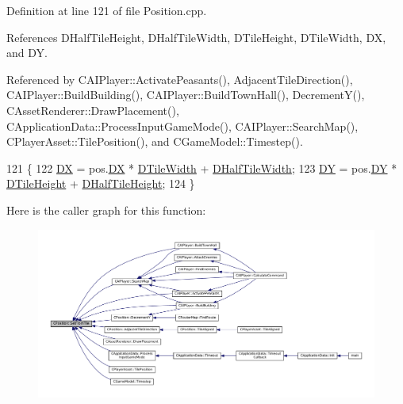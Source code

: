 Definition at line 121 of file Position.\+cpp.



References D\+Half\+Tile\+Height, D\+Half\+Tile\+Width, D\+Tile\+Height, D\+Tile\+Width, DX, and DY.



Referenced by C\+A\+I\+Player\+::\+Activate\+Peasants(), Adjacent\+Tile\+Direction(), C\+A\+I\+Player\+::\+Build\+Building(), C\+A\+I\+Player\+::\+Build\+Town\+Hall(), Decrement\+Y(), C\+Asset\+Renderer\+::\+Draw\+Placement(), C\+Application\+Data\+::\+Process\+Input\+Game\+Mode(), C\+A\+I\+Player\+::\+Search\+Map(), C\+Player\+Asset\+::\+Tile\+Position(), and C\+Game\+Model\+::\+Timestep().


\begin{DoxyCode}
121                                                \{
122     \hyperlink{classCPosition_a28445f9b872169715919074d82044eda}{DX} = pos.\hyperlink{classCPosition_a28445f9b872169715919074d82044eda}{DX} * \hyperlink{classCPosition_ac17d12fb5d35fcf62d63bb42e8cf7ed6}{DTileWidth} + \hyperlink{classCPosition_a3227e835d9008346e9d91bdad2380f14}{DHalfTileWidth};
123     \hyperlink{classCPosition_a84139c9e8eb547e7cf3cb851739943a4}{DY} = pos.\hyperlink{classCPosition_a84139c9e8eb547e7cf3cb851739943a4}{DY} * \hyperlink{classCPosition_a202ebb83e86df75cfb76cf1241ba817c}{DTileHeight} + \hyperlink{classCPosition_a1e0af68f7690b3cfc14687cf7fbe7ade}{DHalfTileHeight};
124 \}
\end{DoxyCode}
Here is the caller graph for this function\+:\nopagebreak
\begin{figure}[H]
\begin{center}
\leavevmode
\includegraphics[width=350pt]{classCPosition_a46994e6a8b8e3b4237edd7259ad844b6_icgraph}
\end{center}
\end{figure}
\hypertarget{classCPosition_a506e9efd21e209e36533ba7e594be75f}{}\label{classCPosition_a506e9efd21e209e36533ba7e594be75f} 
